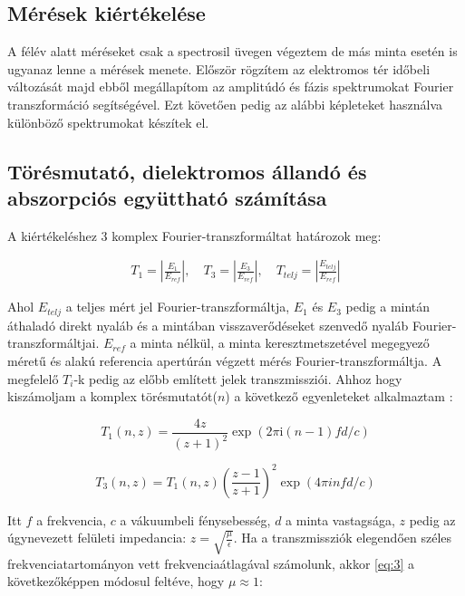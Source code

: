 \documentclass[a4paper,12pt]{article}
\numberwithin{equation}{section}
\begin{document}
\subsection{Mérések kiértékelése}
A félév alatt méréseket csak a spectrosil üvegen végeztem de más minta esetén is ugyanaz lenne a mérések menete. Először rögzítem az elektromos tér időbeli változását majd ebből megállapítom az amplitúdó és fázis spektrumokat Fourier transzformáció segítségével. Ezt követően pedig az alábbi képleteket használva különböző spektrumokat készítek el.


\subsection{Törésmutató, dielektromos állandó és abszorpciós együttható számítása}

A kiértékeléshez 3 komplex Fourier-transzformáltat határozok meg:


\begin{equation*}\label{eq:1}
\begin{gathered}
T_1=\left |\frac{E_1}{E_{ref}}\right |,\quad T_3=\left |\frac{E_3}{E_{ref}}\right |, \quad T_{telj}=\left |\frac{E_{telj}}{E_{ref}}\right |
\end{gathered}
\end{equation*}

Ahol $E_{telj}$ a teljes mért jel Fourier-transzformáltja, $E_{1}$ és $E_{3}$ pedig a mintán áthaladó direkt nyaláb és a mintában visszaverődéseket szenvedő nyaláb Fourier-transzformáltjai. $E_{ref}$ a minta nélkül, a minta keresztmetszetével megegyező méretű és alakú referencia apertúrán végzett mérés Fourier-transzformáltja. A megfelelő $T_i$-k pedig az előbb említett jelek transzmissziói. Ahhoz hogy kiszámoljam a komplex törésmutatót($n$) a következő egyenleteket alkalmaztam \cite{NEMEC2005}:

\begin{equation}\label{eq:2}
T_1(n, z)=\frac{4 z}{(z+1)^2} \exp (2 \pi \mathrm{i}(n-1) f d / c)
\end{equation}

\begin{equation}\label{eq:3}
T_3(n, z)=T_1(n, z)\left(\frac{z-1}{z+1}\right)^2 \exp (4 \pi i n f d / c)
\end{equation}


Itt $f$ a frekvencia, $c$ a vákuumbeli fénysebesség, $d$ a minta vastagsága, $z$ pedig az úgynevezett felületi impedancia: $z = \sqrt{\frac{\mu}{\epsilon}}$. Ha a transzmissziók elegendően széles frekvenciatartományon vett frekvenciaátlagával számolunk, akkor \ref{eq:3} a következőképpen módosul feltéve, hogy $\mu \approx 1$: 
\end{document}
